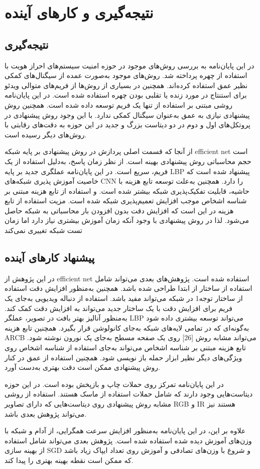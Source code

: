 \chapter{نتیجه‌گیری و کارهای آینده}
\section{نتیجه‌گیری}
در این پایان‌نامه به بررسی روش‌های موجود در حوزه امنیت سیستم‌های احراز هویت با استفاده از چهره پرداخته شد. روش‌های موجود به‌صورت عمده از سیگنال‌های کمکی نظیر عمق استفاده کرده‌اند. همچنین در بسیاری از روش‌ها از فریم‌های متوالی ویدئو برای استنتاج در مورد زنده یا تقلبی بودن چهره استفاده شده است. در این پایان‌نامه روشی مبتنی بر استفاده از تنها یک فریم توسعه داده شده است. همچنین روش پیشنهادی نیازی به عمق به‌عنوان سیگنال کمکی ندارد. با این وجود روش پیشنهادی در پروتکل‌های اول و دوم در دو دیتاست بزرگ و جدید در این حوزه به دقت‌های رقابتی با روش‌های دیگر رسیده است.

از آنجا که قسمت اصلی پردازش در روش پیشنهادی بر پایه شبکه efficient net است حجم محاسباتی روش پیشنهادی بهینه است. از نظر زمان پاسخ، به‌دلیل استفاده از یک فریم، سریع است.
در این پایان‌نامه عملگری جدید بر پایه LBP پیشنهاد شده است که خاصیت آموزش پذیری شبکه‌های CNN را دارد. همچنین به‌علت توسعه تابع هزینه با حاشیه، قابلیت تفکیک‌پذیری شبکه بیشتر شده است. و استفاده از تابع هزینه مبتنی بر شناسه اشخاص موجب افزایش تعمیم‌پذیری شبکه شده است. مزیت استفاده از تابع هزینه در این است که افزایش دقت بدون افزودن بار محاسباتی به شبکه حاصل می‌شود. لذا در روش پیشنهادی با وجود آنکه زمان آموزش بیشتری نیاز دارد اما زمان تست شبکه تغییری نمی‌کند
\section{پیشنهاد کارهای آینده}
در این پژوهش از efficient net استفاده شده است. پژوهش‌های بعدی می‌تواند شامل استفاده از ساختار از ابتدا طراحی شده باشد. همچنین به‌منظور افزایش دقت استفاده از ساختار توجه1 در شبکه می‌تواند مفید باشد. استفاده از دنباله ویدیویی به‌جای یک فریم برای افزایش دقت با یک ساختار جدید می‌تواند به افزایش دقت کمک کند. به‌منظور آنالیز بهتر بافت در تصویر، عملگر LBP می‌تواند توسعه بیشتری داده شود به‌گونه‌ای که در تمامی لایه‌های شبکه به‌جای کانولوشن قرار بگیرد. همچنین تابع هزینه ARCB می‌تواند مشابه روش [26] روی یک صفحه مسطح به‌جای یک نورون نوشته شود. تابع هزینه مبتنی بر شناسه اشخاص می‌تواند به‌جای استفاده از شناسه اشخاص روی ویژگی‌های دیگر نظیر ابزار حمله باز نویسی شود. همچنین استفاده از عمق در کنار روش پیشنهادی ممکن است دقت بهتری به‌دست آورد.

در این پایان‌نامه تمرکز روی حملات چاپ و بازپخش بوده است. در این حوزه دیتاست‌هایی وجود دارند که شامل حملات استفاده از ماسک هستند. استفاده از روشی مشابه روش پیشنهادی روی دیتاست‌هایی که دارای تصاویر RGB و IR هستند نیز می‌تواند پژوهش بعدی باشد.

علاوه بر این، در این پایان‌نامه به‌منظور افزایش سرعت همگرایی، از آدام و شبکه با وزن‌های آموزش دیده شده استفاده شده است. پژوهش بعدی می‌تواند شامل استفاده از بهینه سازی SGD و شروع با وزن‌های تصادفی و آموزش روی تعداد ایپاک زیاد باشد که ممکن است نقطه بهینه بهتری را پیدا کند.
